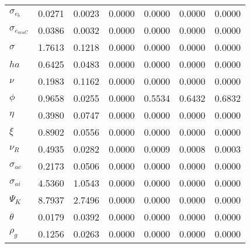 \begin{center}
\begin{longtable}{lcccccc}
$ \sigma_{{e_b}}       $	 & 	          0.0271	 & 	          0.0023	 & 	          0.0000	 & 	          0.0000	 & 	          0.0000	 & 	          0.0000 \\ 
$ \sigma_{{e_{muC}}}   $	 & 	          0.0386	 & 	          0.0032	 & 	          0.0000	 & 	          0.0000	 & 	          0.0000	 & 	          0.0000 \\ 
$ {\sigma}             $	 & 	          1.7613	 & 	          0.1218	 & 	          0.0000	 & 	          0.0000	 & 	          0.0000	 & 	          0.0000 \\ 
$ {ha}                 $	 & 	          0.6425	 & 	          0.0483	 & 	          0.0000	 & 	          0.0000	 & 	          0.0000	 & 	          0.0000 \\ 
$ \nu                  $	 & 	          0.1983	 & 	          0.1162	 & 	          0.0000	 & 	          0.0000	 & 	          0.0000	 & 	          0.0000 \\ 
$ {\phi}               $	 & 	          0.9658	 & 	          0.0255	 & 	          0.0000	 & 	          0.5534	 & 	          0.6432	 & 	          0.6832 \\ 
$ {\eta}               $	 & 	          0.3980	 & 	          0.0747	 & 	          0.0000	 & 	          0.0000	 & 	          0.0000	 & 	          0.0000 \\ 
$ \xi                  $	 & 	          0.8902	 & 	          0.0556	 & 	          0.0000	 & 	          0.0000	 & 	          0.0000	 & 	          0.0000 \\ 
$ {\nu_R}              $	 & 	          0.4935	 & 	          0.0282	 & 	          0.0000	 & 	          0.0009	 & 	          0.0008	 & 	          0.0003 \\ 
$ {\sigma_{ac}}        $	 & 	          0.2173	 & 	          0.0506	 & 	          0.0000	 & 	          0.0000	 & 	          0.0000	 & 	          0.0000 \\ 
$ {\sigma_{ai}}        $	 & 	          4.5360	 & 	          1.0543	 & 	          0.0000	 & 	          0.0000	 & 	          0.0000	 & 	          0.0000 \\ 
$ {\Psi_{K}}           $	 & 	          8.7937	 & 	          2.7496	 & 	          0.0000	 & 	          0.0000	 & 	          0.0000	 & 	          0.0000 \\ 
$ {\theta}             $	 & 	          0.0179	 & 	          0.0392	 & 	          0.0000	 & 	          0.0000	 & 	          0.0000	 & 	          0.0000 \\ 
$ {\rho_g}             $	 & 	          0.1256	 & 	          0.0263	 & 	          0.0000	 & 	          0.0000	 & 	          0.0000	 & 	          0.0000 \\ 

\end{longtable}
\end{center}
